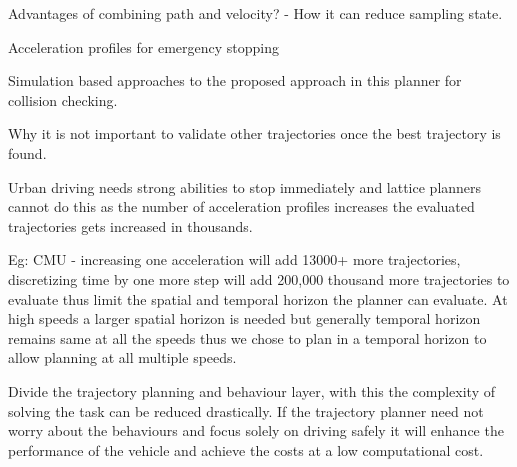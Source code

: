 Advantages of combining path and velocity? - How it can reduce sampling state. 

Acceleration profiles for emergency stopping 

Simulation based approaches to the proposed approach in this planner for collision checking. 

Why it is not important to validate other trajectories once the best trajectory is found. 

Urban driving needs strong abilities to stop immediately and lattice planners cannot do this as the number of acceleration profiles increases the evaluated trajectories gets increased in thousands. 

Eg: CMU - increasing one acceleration will add 13000+ more trajectories, discretizing time by one more step will add 200,000 thousand more trajectories to evaluate thus limit the spatial and temporal horizon the planner can evaluate. At high speeds a larger spatial horizon is needed but generally temporal horizon remains same at all the speeds thus we chose to plan in a temporal horizon to allow planning at all multiple speeds. 


Divide the trajectory planning and behaviour layer, with this the complexity of solving the task can be reduced drastically. If the trajectory planner need not worry about the behaviours and focus solely on driving safely it will enhance the performance of the vehicle and achieve the costs at a low computational cost.  



